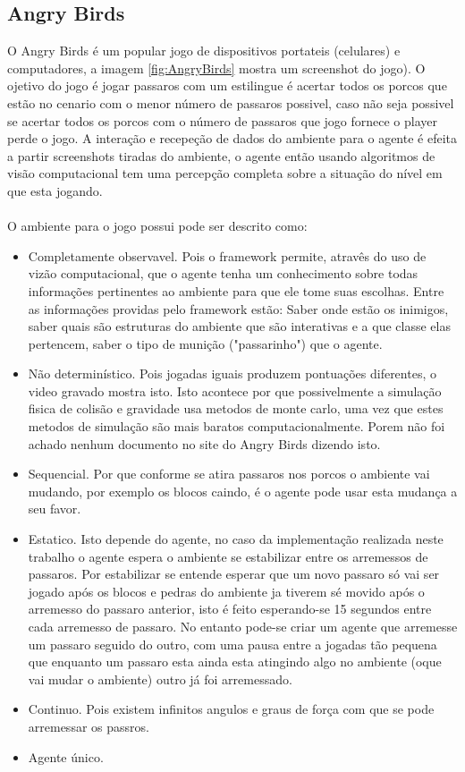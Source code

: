 \documentclass[10pt,a4paper]{article}
\begin{document}
\subsection{Angry Birds}
\label{sec:angryBirds}
O Angry Birds é um popular jogo de dispositivos portateis (celulares) e computadores, a imagem \ref{fig:AngryBirds} mostra um screenshot do jogo). O ojetivo do jogo é jogar passaros com um estilingue é acertar todos os porcos que estão no cenario com o menor número de passaros possivel, caso não seja possivel se acertar todos os porcos com o número de passaros que jogo fornece o player perde o jogo. A interação  e recepeção de dados do ambiente para o agente é efeita a partir screenshots tiradas do ambiente, o agente então usando algoritmos de visão computacional tem uma percepção completa sobre a situação do nível em que esta jogando.   \\ \\
O ambiente para o jogo possui pode ser descrito como: 
\begin{itemize}
\item Completamente observavel. Pois o framework permite, atravês do uso de vizão computacional, que o agente tenha um conhecimento sobre todas informações pertinentes ao ambiente para que ele tome suas escolhas. Entre as informações providas pelo framework estão: Saber onde estão os inimigos, saber quais são estruturas do ambiente que são interativas e a que classe elas pertencem, saber o tipo de munição ("passarinho") que o agente.
\item  Não determinístico. Pois jogadas iguais produzem pontuações diferentes, o video gravado \cite{videoMostrandoQueOjogoNaoEDeterministico} mostra isto. Isto acontece por que possivelmente a simulação fisica de colisão e gravidade usa metodos de monte carlo, uma vez que estes metodos de simulação são mais baratos computacionalmente. Porem não foi achado nenhum documento no site do Angry Birds dizendo isto.
\item Sequencial. Por que conforme se atira passaros nos porcos o ambiente vai mudando, por exemplo os blocos caindo, é o agente pode usar esta mudança a seu favor.
\item Estatico. Isto depende do agente, no caso da implementação realizada neste trabalho o agente espera o ambiente se estabilizar entre os arremessos de passaros. Por estabilizar se entende esperar que um novo passaro só vai ser jogado após os blocos e pedras do ambiente ja tiverem sé movido após o arremesso do passaro anterior, isto é feito esperando-se 15 segundos entre cada arremesso de passaro.  No entanto pode-se criar um agente que arremesse um passaro seguido do outro, com uma pausa entre a jogadas tão pequena que enquanto um passaro esta ainda esta atingindo algo no ambiente (oque vai mudar o ambiente) outro já foi arremessado. 
\item Continuo. Pois existem infinitos angulos e graus de força com que se pode arremessar os passros.
\item Agente único. 
\end{itemize}
\end{document}
